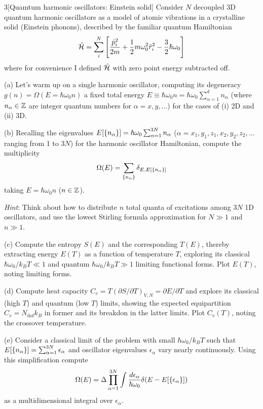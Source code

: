 \documentclass[12pt]{article}
\begin{document}
\begin{problem}{3}[Quamtum harmonic oscillators: Einstein solid]
Consider $N$ decoupled 3D quantum harmonic oscillators as a model of atomic
vibrations in a crystalline solid (Einstein phonons), described by the familiar
quantum Hamiltonian
\begin{equation}
    \hat{\mathcal{H}}=\sum_{i}^N\qty[\frac{\hat{p}_i^2}{2m}+\frac12m\omega_0^2\hat{r}_i^2-\frac32\hbar\omega_0] 
\end{equation}
where for convenience I defined $\hat{\mathcal{H}}$ with zero point energy subtracted off.

(a) Let's warm up on a single harmonic oscillator, computing its degeneracy
$g(n)=\Omega(E=\hbar\omega_0n)$ a fixed total energy
$E\equiv\hbar\omega_0n=\hbar\omega_0\sum_{\alpha=1}^dn_\alpha$ (where
$n_\alpha\in\mathbb{Z}$ are integer quantum numbers for $\alpha=x,y,\hdots$) for the
cases of (i) 2D and (ii) 3D.

(b) Recalling the eigenvalues
$E[\qty{n_\alpha}]=\hbar\omega_0\sum_{\alpha=1}^{3N}n_\alpha$
($\alpha=x_1,y_1,z_1,x_2,y_2,z_2,\hdots$ ranging from 1 to $3N$) for the
harmonic oscillator Hamiltonian, compute the multiplicity
\begin{equation}
    \Omega(E)=\sum_{\qty{n_\alpha}}\delta_{E,E[\qty{n_\alpha}]} 
\end{equation}
taking $E=\hbar\omega_0n$ ($n\in\mathbb{Z}$).

\textit{Hint}: Think about how to distribute $n$ total quanta of excitations
among $3N$ 1D oscillators, and use the lowest Stirling formula approximation for
$N\gg 1$ and $n\gg 1$.

(c) Compute the entropy $S(E)$ and the corresponding $T(E)$, thereby extracting
energy $E(T)$ as a function of temperature $T$, exploring its classical
$\hbar\omega_0/k_BT\ll1$ and quantum $\hbar\omega_0/k_BT\gg1$ limiting
functional forms. Plot $E(T)$, noting limiting forms.

(d) Compute heat capacity
$C_v=T(\partial S/\partial T)_{V,N}=\partial E/\partial T$ and explore its 
classical (high $T$) and quantum (low $T$) limits, showing
the expected equipartition $C_v=N_\text{dof}k_B$ in former and its breakdon in
the latter limits. Plot $C_v(T)$, noting the crossover temperature.

(e) Consider a classical limit of the problem with small $\hbar\omega_0/k_BT$
such that $E[\qty{n_\alpha}]=\sum_{\alpha=1}^{3N}\epsilon_\alpha$ and oscillator
eigenvalues $\epsilon_\alpha$ vary nearly continuously. Using this
simplification compute
\begin{equation}
    \Omega(E)=\Delta\prod_{\alpha=1}^{3N}\int\frac{d\epsilon_\alpha}{\hbar\omega_0}
    \delta(E-E[\qty{\epsilon_\alpha}]) 
\end{equation}
as a multidimensional integral over $\epsilon_\alpha$.


\end{problem}
\end{document}
